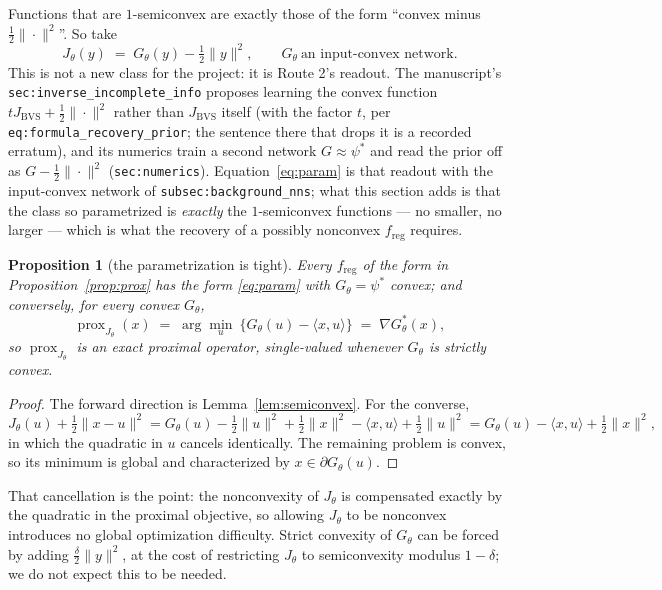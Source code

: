 \documentclass[11pt]{article}
\newtheorem{proposition}{Proposition}
\theoremstyle{definition}
\newcommand{\freg}{f_{\mathrm{reg}}}
\newcommand{\prox}{\operatorname{prox}}
\newcommand{\code}[1]{\texttt{#1}}
\newcommand{\Jbvs}{J_{\mathrm{BVS}}}
\begin{document}
Functions that are $1$-semiconvex are exactly those of the form ``convex minus $\tfrac12\|\cdot\|^2$''. So take
\begin{equation}
\label{eq:param}
J_\theta(y) \;=\; G_\theta(y) - \tfrac12\|y\|^2, \qquad G_\theta \ \text{an input-convex network}.
\end{equation}
This is not a new class for the project: it is Route 2's readout. The manuscript's \code{sec:inverse\_incomplete\_info} proposes learning the convex function $t\Jbvs + \tfrac12\|\cdot\|^2$ rather than $\Jbvs$ itself (with the factor $t$, per \code{eq:formula\_recovery\_prior}; the sentence there that drops it is a recorded erratum), and its numerics train a second network $G \approx \psi^*$ and read the prior off as $G - \tfrac12\|\cdot\|^2$ (\code{sec:numerics}). Equation~\eqref{eq:param} is that readout with the input-convex network of \code{subsec:background\_nns}; what this section adds is that the class so parametrized is \emph{exactly} the $1$-semiconvex functions — no smaller, no larger — which is what the recovery of a possibly nonconvex $\freg$ requires.

\begin{proposition}[the parametrization is tight]
\label{prop:tight}
Every $\freg$ of the form in Proposition~\ref{prop:prox} has the form \eqref{eq:param} with $G_\theta = \psi^*$ convex; and conversely, for every convex $G_\theta$,
\begin{equation}
\label{eq:prox_G}
\prox_{J_\theta}(x) \;=\; \arg\min_u\ \big\{G_\theta(u) - \langle x,u\rangle\big\} \;=\; \nabla G_\theta^*(x),
\end{equation}
so $\prox_{J_\theta}$ is an exact proximal operator, single-valued whenever $G_\theta$ is strictly convex.
\end{proposition}

\begin{proof}
The forward direction is Lemma~\ref{lem:semiconvex}. For the converse,
\[
J_\theta(u) + \tfrac12\|x-u\|^2 = G_\theta(u) - \tfrac12\|u\|^2 + \tfrac12\|x\|^2 - \langle x,u\rangle + \tfrac12\|u\|^2 = G_\theta(u) - \langle x,u\rangle + \tfrac12\|x\|^2 ,
\]
in which the quadratic in $u$ cancels identically. The remaining problem is convex, so its minimum is global and characterized by $x\in\partial G_\theta(u)$.
\end{proof}

That cancellation is the point: the nonconvexity of $J_\theta$ is compensated exactly by the quadratic in the proximal objective, so allowing $J_\theta$ to be nonconvex introduces no global optimization difficulty. Strict convexity of $G_\theta$ can be forced by adding $\tfrac{\delta}{2}\|y\|^2$, at the cost of restricting $J_\theta$ to semiconvexity modulus $1-\delta$; we do not expect this to be needed.
\end{document}
